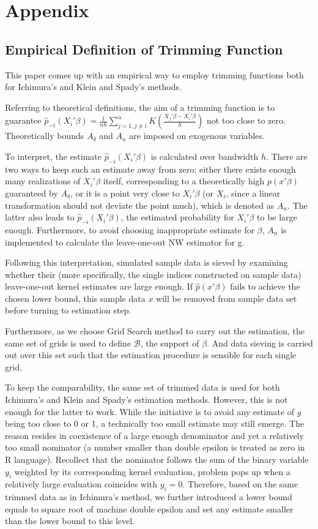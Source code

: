 \documentclass[a4paper]{article}
\begin{document}
\section{Appendix}

\subsection{Empirical Definition of Trimming Function}
This paper comes up with an empirical way to employ trimming functions both for Ichimura's and Klein and Spady's methods.

Referring to theoretical definitions, the aim of a trimming function is to guarantee $\hat{p}_{-i}(X_i'\beta) = \frac{1}{nh}\sum_{j=1,j \neq i}^{n}K(\frac{X_j'\beta - X_i'\beta}{h})$ not too close to zero. Theoretically bounds $A_\delta$ and $A_n$ are imposed on exogenous variables.

To interpret, the estimate $\hat{p}_{-i}(X_i'\beta)$ is calculated over bandwidth $h$. There are two ways to keep such an estimate away from zero: either there exists enough many realizations of $X_i'\beta$ itself, corresponding to a theoretically high $p(x'\beta)$ guaranteed by $A_\delta$, or it is a point very close to $X_i'\beta$ (or $X_i$, since a linear transformation should not deviate the point much), which is denoted as $A_n$. The latter also leads to $\hat{p}_{-i}(X_i'\beta)$, the estimated probability for $X_i'\beta$ to be large enough. Furthermore, to avoid choosing inappropriate estimate for $\beta$, $A_n$ is implemented to calculate the leave-one-out NW estimator for g.

Following this interpretation, simulated sample data is sieved by examining whether their (more specifically, the single indices constructed on sample data) leave-one-out kernel estimates are large enough. If $\hat{p}(x'\beta)$ fails to achieve the chosen lower bound, this sample data $x$ will be removed from sample data set before turning to estimation step.

Furthermore, as we choose Grid Search method to carry out the estimation, the same set of grids is used to define $\mathcal{B}$, the support of $\beta$. And data sieving is carried out over this set such that the estimation procedure is sensible for each single grid.

To keep the comparability, the same set of trimmed data is used for both Ichimura's and Klein and Spady's estimation methods. However, this is not enough for the latter to work. While the initiative is to avoid any estimate of $g$ being too close to 0 or 1, a technically too small estimate may still emerge. The reason resides in coexistence of a large enough denominator and yet a relatively too small nominator (a number smaller than double epsilon is treated as zero in R language). Recollect that the nominator follows the sum of the binary variable $y_i$ weighted by its corresponding kernel evaluation, problem pops up when a relatively large evaluation coincides with $y_i = 0$. Therefore, based on the same trimmed data as in Ichimura's method, we further introduced a lower bound equals to square root of machine double epsilon and set any estimate smaller than the lower bound to this level.
\end{document}
